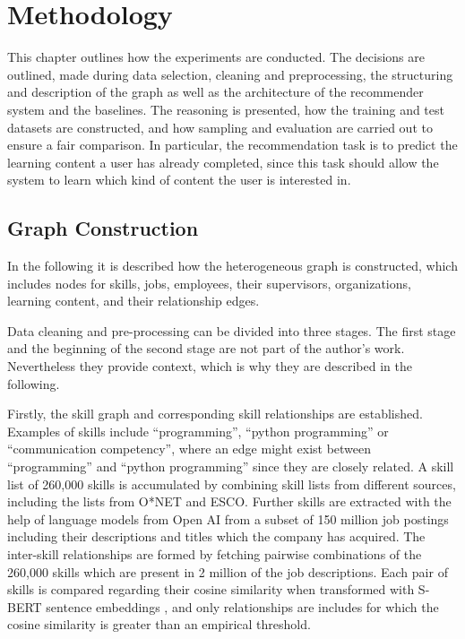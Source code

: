 \chapter{Methodology}
\label{ch:methodology}
This chapter outlines how the experiments are conducted. The decisions are outlined, made during data selection, cleaning and preprocessing, the structuring and description of the graph as well as the architecture of the recommender system and the baselines. The reasoning is presented, how the training and test datasets are constructed, and how sampling and evaluation are carried out to ensure a fair comparison. In particular, the recommendation task is to predict the learning content a user has already completed, since this task should allow the system to learn which kind of content the user is interested in.

\section{Graph Construction}
In the following it is described how the heterogeneous graph is constructed, which includes nodes for skills, jobs, employees, their supervisors, organizations, learning content, and their relationship edges.

Data cleaning and pre-processing can be divided into three stages. 
The first stage  and the beginning of the second stage are not part of the author's work. Nevertheless they provide context, which is why they are described in the following. 

Firstly, the skill graph and corresponding skill relationships are established. Examples of skills include “programming”, “python programming” or “communication competency”, where an edge might exist between “programming” and “python programming” since they are closely related. A skill list of 260,000 skills is accumulated by combining skill lists from different sources, including the lists from O*NET \parencite{onetonline} and ESCO\parencite{escoonline}. Further skills are extracted with the help of language models from Open AI \parencite{OpenAI2023GPT4TR} from a subset of 150 million job postings including their descriptions and titles which the company has acquired. The inter-skill relationships are formed by fetching pairwise combinations of the 260,000 skills which are present in 2 million of the job descriptions. Each pair of skills is compared regarding their cosine similarity when transformed with S-BERT sentence embeddings \parencite{Reimers2019SentenceBERTSE} \parencite{sbertmodel}, and only relationships are includes for which the cosine similarity is greater than an empirical threshold.

